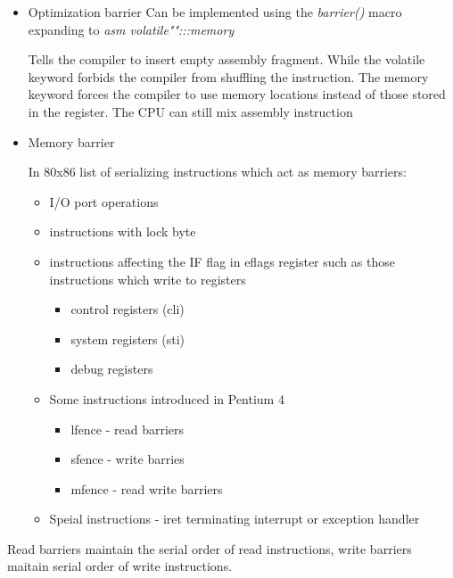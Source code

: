 \documentclass{article}
\begin{document}
\begin{itemize}

\item{Optimization barrier} Can be implemented using the
  \emph{barrier()} macro expanding to \emph{asm volatile"":::memory}

  Tells the compiler to insert empty assembly fragment. While the
  volatile keyword forbids the compiler from shuffling the
  instruction.  The memory keyword forces the compiler to use memory
  locations instead of those stored in the register. The CPU can still
  mix assembly instruction


  
  
\item{Memory barrier}

  In 80x86 list of serializing instructions which act as memory
  barriers:


  \begin{itemize}
    \item I/O port operations
    \item instructions with lock byte
    \item instructions affecting the IF flag in eflags register such as those instructions which write to registers
      \begin{itemize}
        \item control registers (cli)
        \item system  registers (sti)
        \item debug   registers          
      \end {itemize}
    \item Some instructions introduced in Pentium 4
      \begin{itemize}
        \item lfence - read barriers
        \item sfence - write barries
        \item mfence - read write barriers
      \end{itemize}
    \item Speial instructions - iret terminating interrupt or exception handler                  
  \end{itemize}
  
\end{itemize}

Read barriers maintain the serial order of read instructions, write
barriers maitain serial order of write instructions.
\end{document}
